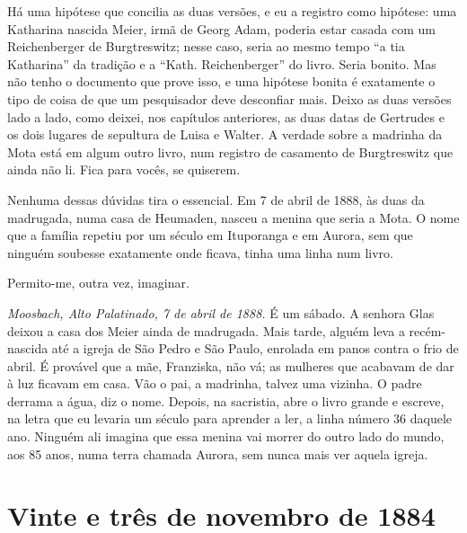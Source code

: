 \documentclass[
  brazilian,
  11pt,
  openany]{book}
\begin{document}
Há uma hipótese que concilia as duas versões, e eu a registro como
hipótese: uma Katharina nascida Meier, irmã de Georg Adam, poderia estar
casada com um Reichenberger de Burgtreswitz; nesse caso, seria ao mesmo
tempo ``a tia Katharina'' da tradição e a ``Kath. Reichenberger'' do
livro. Seria bonito. Mas não tenho o documento que prove isso, e uma
hipótese bonita é exatamente o tipo de coisa de que um pesquisador deve
desconfiar mais. Deixo as duas versões lado a lado, como deixei, nos
capítulos anteriores, as duas datas de Gertrudes e os dois lugares de
sepultura de Luisa e Walter. A verdade sobre a madrinha da Mota está em
algum outro livro, num registro de casamento de Burgtreswitz que ainda
não li. Fica para vocês, se quiserem.

Nenhuma dessas dúvidas tira o essencial. Em 7 de abril de 1888, às duas
da madrugada, numa casa de Heumaden, nasceu a menina que seria a Mota. O
nome que a família repetiu por um século em Ituporanga e em Aurora, sem
que ninguém soubesse exatamente onde ficava, tinha uma linha num livro.

Permito-me, outra vez, imaginar.

\emph{Moosbach, Alto Palatinado, 7 de abril de 1888.} É um sábado. A
senhora Glas deixou a casa dos Meier ainda de madrugada. Mais tarde,
alguém leva a recém-nascida até a igreja de São Pedro e São Paulo,
enrolada em panos contra o frio de abril. É provável que a mãe,
Franziska, não vá; as mulheres que acabavam de dar à luz ficavam em
casa. Vão o pai, a madrinha, talvez uma vizinha. O padre derrama a água,
diz o nome. Depois, na sacristia, abre o livro grande e escreve, na
letra que eu levaria um século para aprender a ler, a linha número 36
daquele ano. Ninguém ali imagina que essa menina vai morrer do outro
lado do mundo, aos 85 anos, numa terra chamada Aurora, sem nunca mais
ver aquela igreja.

\section{Vinte e três de novembro de
1884}\label{vinte-e-truxeas-de-novembro-de-1884}
\end{document}
